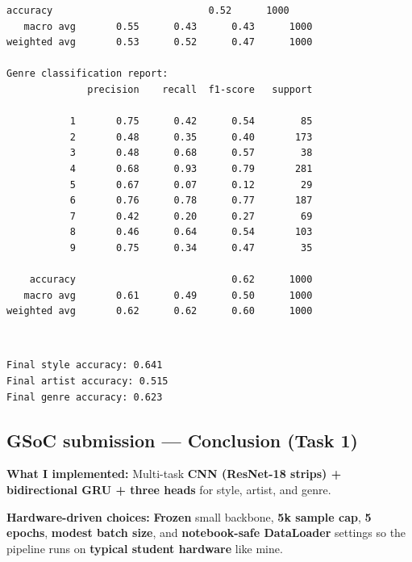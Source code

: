 \documentclass[11pt]{article}
\begin{document}
\begin{Verbatim}[commandchars=\\\{\}]
    accuracy                           0.52      1000
   macro avg       0.55      0.43      0.43      1000
weighted avg       0.53      0.52      0.47      1000

Genre classification report:
              precision    recall  f1-score   support

           1       0.75      0.42      0.54        85
           2       0.48      0.35      0.40       173
           3       0.48      0.68      0.57        38
           4       0.68      0.93      0.79       281
           5       0.67      0.07      0.12        29
           6       0.76      0.78      0.77       187
           7       0.42      0.20      0.27        69
           8       0.46      0.64      0.54       103
           9       0.75      0.34      0.47        35

    accuracy                           0.62      1000
   macro avg       0.61      0.49      0.50      1000
weighted avg       0.62      0.62      0.60      1000

    \end{Verbatim}

    \begin{center}
    \end{center}
    { \hspace*{\fill} \\}
    
    \begin{Verbatim}[commandchars=\\\{\}]
Final style accuracy: 0.641
Final artist accuracy: 0.515
Final genre accuracy: 0.623
    \end{Verbatim}

    \subsection{GSoC submission --- Conclusion (Task
1)}\label{gsoc-submission-conclusion-task-1}

\textbf{What I implemented:} Multi-task \textbf{CNN (ResNet-18 strips) +
bidirectional GRU + three heads} for style, artist, and genre.

\textbf{Hardware-driven choices:} \textbf{Frozen} small backbone,
\textbf{5k sample cap}, \textbf{5 epochs}, \textbf{modest batch size},
and \textbf{notebook-safe DataLoader} settings so the pipeline runs on
\textbf{typical student hardware} like mine.
\end{document}
